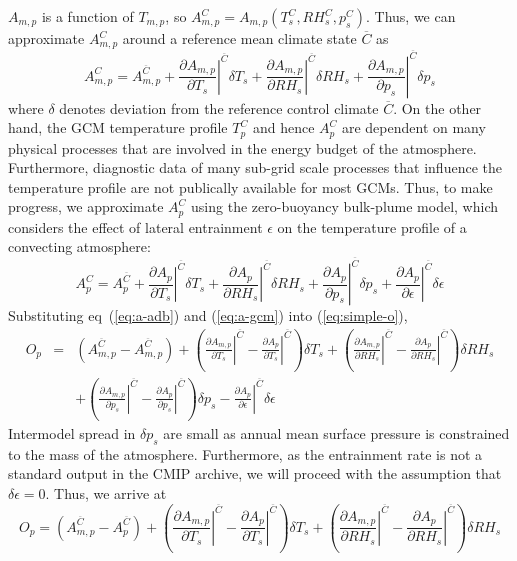 \documentclass[draft]{agujournal2019}
\begin{document}
$A_{m,p}$ is a function of $T_{m,p}$, so $A_{m,p}^C=A_{m,p}(T_s^C, RH_s^C, p_s^C)$. Thus, we can approximate $A_{m,p}^C$ around a reference mean climate state $\overline{C}$ as
\begin{equation} \label{eq:a-adb}
    A_{m,p}^C = A_{m,p}^{\overline{C}} + \left.\frac{\partial A_{m,p}}{\partial T_s}\right|^{\overline{C}}\delta{T_s} + \left.\frac{\partial A_{m,p}}{\partial RH_s}\right|^{\overline{C}}\delta{RH_s} + \left.\frac{\partial A_{m,p}}{\partial p_s}\right|^{\overline{C}}\delta{p_s}
\end{equation}
where $\delta$ denotes deviation from the reference control climate $\overline{C}$. On the other hand, the GCM temperature profile $T_{p}^C$ and hence $A_{p}^C$ are dependent on many physical processes that are involved in the energy budget of the atmosphere. Furthermore, diagnostic data of many sub-grid scale processes that influence the temperature profile are not publically available for most GCMs. Thus, to make progress, we approximate $A_{p}^C$ using the zero-buoyancy bulk-plume model, which considers the effect of lateral entrainment $\epsilon$ on the temperature profile of a convecting atmosphere:
\begin{equation} \label{eq:a-gcm}
	A_{p}^C = A_{p}^{\overline{C}} + \left.\frac{\partial A_{p}}{\partial T_s}\right|^{\overline{C}}\delta{T_s} + \left.\frac{\partial A_{p}}{\partial RH_s}\right|^{\overline{C}}\delta{RH_s} + \left.\frac{\partial A_{p}}{\partial p_s}\right|^{\overline{C}}\delta{p_s} + \left.\frac{\partial A_{p}}{\partial \epsilon}\right|^{\overline{C}}\delta{\epsilon}
\end{equation}
Substituting eq~(\ref{eq:a-adb}) and (\ref{eq:a-gcm}) into (\ref{eq:simple-o}),
\begin{eqnarray}
    O_p & = & (A_{m,p}^{\overline{C}} - A_{m,p}^{\overline{C}}) + \left(\left.\frac{\partial A_{m,p}}{\partial T_s}\right|^{\overline{C}} - \left.\frac{\partial A_{p}}{\partial T_s}\right|^{\overline{C}}\right)\delta{T_s} + \left(\left.\frac{\partial A_{m,p}}{\partial RH_s}\right|^{\overline{C}} - \left.\frac{\partial A_{p}}{\partial RH_s}\right|^{\overline{C}}\right)\delta{RH_s} \nonumber \\
    && + \left(\left.\frac{\partial A_{m,p}}{\partial p_s}\right|^{\overline{C}} - \left.\frac{\partial A_{p}}{\partial p_s}\right|^{\overline{C}}\right)\delta{p_s} - \left.\frac{\partial A_{p}}{\partial \epsilon}\right|^{\overline{C}}\delta{\epsilon}
\end{eqnarray}
Intermodel spread in $\delta{p_s}$ are small as annual mean surface pressure is constrained to the mass of the atmosphere. Furthermore, as the entrainment rate is not a standard output in the CMIP archive, we will proceed with the assumption that $\delta{\epsilon}=0$. Thus, we arrive at
\begin{equation} \label{eq:final-o}
    O_p = (A_{m,p}^{\overline{C}} - A_{p}^{\overline{C}}) + \left(\left.\frac{\partial A_{m,p}}{\partial T_s}\right|^{\overline{C}} - \left.\frac{\partial A_{p}}{\partial T_s}\right|^{\overline{C}}\right)\delta{T_s} + \left(\left.\frac{\partial A_{m,p}}{\partial RH_s}\right|^{\overline{C}} - \left.\frac{\partial A_{p}}{\partial RH_s}\right|^{\overline{C}}\right)\delta{RH_s}
\end{equation}
\end{document}
